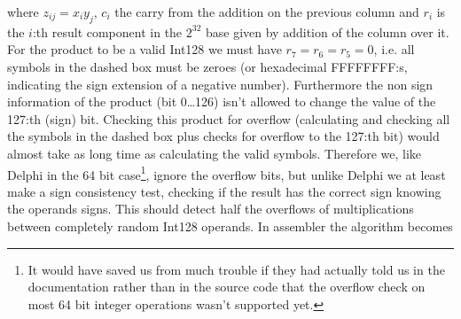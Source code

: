 where $z_{ij}=x_iy_j$, $c_i$ the carry from the addition on the previous column and $r_i$ is the $i$:th result component in the $2^{32}$ base given by addition of the column over it.
For the product to be a valid Int128 we must have $r_7=r_6=r_5=0$, i.e. all symbols in the dashed box must be zeroes (or hexadecimal FFFFFFFF:s, indicating the sign extension of a negative number).  
Furthermore the non sign information of the product (bit 0\dots 126) isn't allowed to change the value of the 127:th (sign) bit.
Checking this product for overflow (calculating and checking all the symbols in the dashed box plus checks for overflow to the 127:th bit) would almost take as long time as calculating the valid symbols. Therefore we, like Delphi in the 64 bit case\footnote{It would have saved us from much trouble if they had actually told us in the documentation rather than in the source code that the overflow check on most 64 bit integer operations wasn't supported yet.}, ignore the overflow bits, but unlike Delphi we at least make a sign consistency test, checking if the result has the correct sign knowing the operands signs. This should detect half the overflows of multiplications between completely random Int128 operands. 
In assembler the algorithm  becomes 
